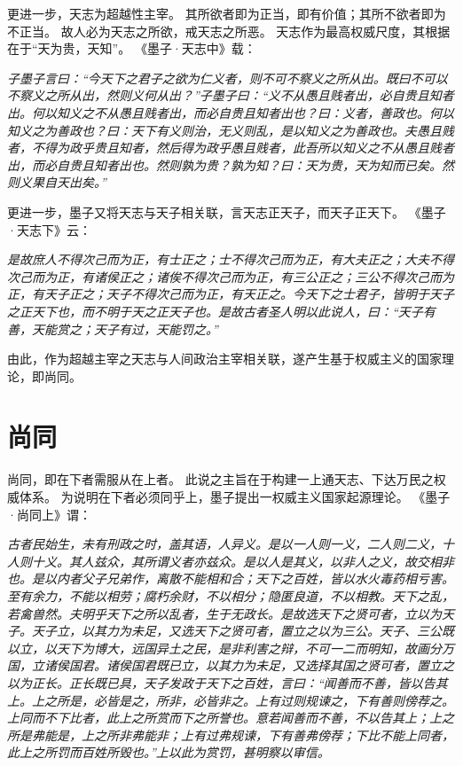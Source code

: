 \documentclass[11pt]{article}
\begin{document}
\par

更进一步，天志为超越性主宰。
其所欲者即为正当，即有价值；其所不欲者即为不正当。
故人必为天志之所欲，戒天志之所恶。
天志作为最高权威尺度，其根据在于“天为贵，天知”。
《墨子·天志中》载：

\textit{子墨子言曰：“今天下之君子之欲为仁义者，则不可不察义之所从出。既曰不可以不察义之所从出，然则义何从出？”子墨子曰：“义不从愚且贱者出，必自贵且知者出。何以知义之不从愚且贱者出，而必自贵且知者出也？曰：义者，善政也。何以知义之为善政也？曰：天下有义则治，无义则乱，是以知义之为善政也。夫愚且贱者，不得为政乎贵且知者，然后得为政乎愚且贱者，此吾所以知义之不从愚且贱者出，而必自贵且知者出也。然则孰为贵？孰为知？曰：天为贵，天为知而已矣。然则义果自天出矣。”}

\par

更进一步，墨子又将天志与天子相关联，言天志正天子，而天子正天下。
《墨子·天志下》云：

\textit{是故庶人不得次己而为正，有士正之；士不得次己而为正，有大夫正之；大夫不得次己而为正，有诸侯正之；诸俟不得次己而为正，有三公正之；三公不得次己而为正，有天子正之；天子不得次己而为正，有天正之。今天下之士君子，皆明于天子之正天下也，而不明于天之正天子也。是故古者圣人明以此说人，曰：“天子有善，天能赏之；天子有过，天能罚之。”}

由此，作为超越主宰之天志与人间政治主宰相关联，遂产生基于权威主义的国家理论，即尚同。

\section{尚同}
尚同，即在下者需服从在上者。
此说之主旨在于构建一上通天志、下达万民之权威体系。
为说明在下者必须同乎上，墨子提出一权威主义国家起源理论。
《墨子·尚同上》谓：

\textit{古者民始生，未有刑政之时，盖其语，人异义。是以一人则一义，二人则二义，十人则十义。其人兹众，其所谓义者亦兹众。是以人是其义，以非人之义，故交相非也。是以内者父子兄弟作，离散不能相和合；天下之百姓，皆以水火毒药相亏害。至有余力，不能以相劳；腐朽余财，不以相分；隐匿良道，不以相教。天下之乱，若禽兽然。夫明乎天下之所以乱者，生于无政长。是故选天下之贤可者，立以为天子。天子立，以其力为未足，又选天下之贤可者，置立之以为三公。天子、三公既以立，以天下为博大，远国异土之民，是非利害之辩，不可一二而明知，故画分万国，立诸侯国君。诸侯国君既已立，以其力为未足，又选择其国之贤可者，置立之以为正长。正长既已具，天子发政于天下之百姓，言曰：“闻善而不善，皆以告其上。上之所是，必皆是之，所非，必皆非之。上有过则规谏之，下有善则傍荐之。上同而不下比者，此上之所赏而下之所誉也。意若闻善而不善，不以告其上；上之所是弗能是，上之所非弗能非；上有过弗规谏，下有善弗傍荐；下比不能上同者，此上之所罚而百姓所毁也。”上以此为赏罚，甚明察以审信。}
\end{document}
